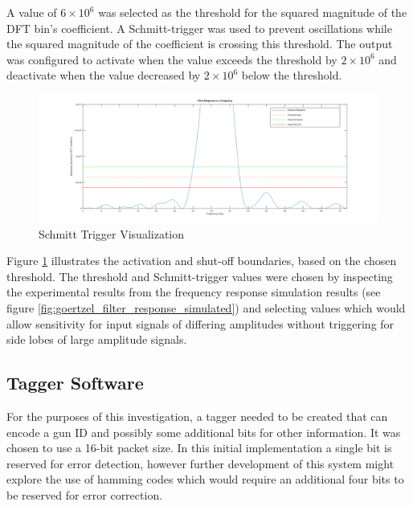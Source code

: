 A value of $6\times 10^{6}$ was selected as the threshold for the squared magnitude of the DFT bin's coefficient. A Schmitt-trigger was used to prevent oscillations while the squared magnitude of the coefficient is crossing this threshold. The output was configured to activate when the value exceeds the threshold by $2\times 10^{6}$ and deactivate when the value decreased by $2\times 10^{6}$ below the threshold.

\begin{figure}[H]
	\centering
	\includegraphics[width=.8\textwidth]{figures/design/schmit_simulation_wide.png}
	\caption{Schmitt Trigger Visualization}
	\label{fig:schmit_simulation_wide}
\end{figure}

Figure \ref{fig:schmit_simulation_wide} illustrates the activation and shut-off boundaries, based on the chosen threshold. The threshold and Schmitt-trigger values were chosen by inspecting the experimental results from the frequency response simulation results (see figure \ref{fig:goertzel_filter_response_simulated}) and selecting values which would allow sensitivity for input signals of differing amplitudes without triggering for side lobes of large amplitude signals.








\subsection{Tagger Software}

For the purposes of this investigation, a tagger needed to be created that can encode a gun ID and possibly some additional bits for other information. It was chosen to use a 16-bit packet size. In this initial implementation a single bit is reserved for error detection, however further development of this system might explore the use of hamming codes which would require an additional four bits to be reserved for error correction.

